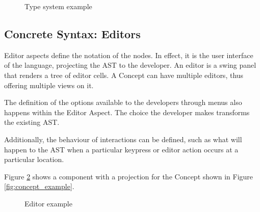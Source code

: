 \begin{figure}[h]
    \centering
    \caption{Type system example}
    \label{fig:typesystem_example}
\end{figure}

\subsection{Concrete Syntax: Editors}
Editor aspects define the notation of the nodes.
In effect, it is the user interface of the language, projecting the AST to the developer.
An editor is a swing panel that renders a tree of editor cells.
A Concept can have multiple editors, thus offering multiple views on it.

The definition of the options available to the developers through menus also happens within the Editor Aspect. 
The choice the developer makes transforms the existing AST.

Additionally, the behaviour of interactions can be defined, such as what will happen to the AST when a particular keypress or editor action occurs at a particular location.

Figure \ref{fig:editor_example} shows a component with a projection for the Concept shown in Figure \ref{fig:concept_example}.

\begin{figure}[h]
    \centering
    \caption{Editor example}
    \label{fig:editor_example}
\end{figure}

